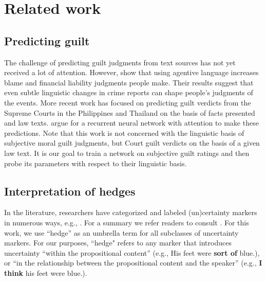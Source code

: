 \documentclass[11pt,a4paper]{article}
\begin{document}
\section{Related work}

\subsection{Predicting guilt}
The challenge of predicting guilt judgments from text sources has not yet received a lot of attention. 
However, \citeauthor{Fausey:Boroditsky:2010} show that using agentive language increases blame and financial liability judgments people make. Their results suggest that even subtle linguistic changes in crime reports can shape people's judgments of the events.
More recent work has focused on predicting guilt verdicts from the Supreme Courts in the Philippines \citep{virtucio2018predicting} and Thailand \citep{kowsrihawat2018predicting} on the basis of facts presented and law texts. \citeauthor{kowsrihawat2018predicting} argue for a recurrent neural network with attention to make these predictions. Note that this work is not concerned with the linguistic basis of subjective moral guilt judgments, but Court guilt verdicts on the basis of a given law text. 
It is our goal to train a network on subjective guilt ratings and then probe its parameters with respect to their linguistic basis.

\subsection{Interpretation of hedges}

In the literature, researchers have categorized and labeled (un)certainty markers in numerous ways, e.g., \citep{lakoff1972hedges, prince1982hedging, brown1987politeness}. For a summary we refer readers to consult \cite{fraser2010pragmatic}. 
For this work, we use ``hedge'' as an umbrella term for all subclasses of uncertainty markers. For our purposes, ``hedge" refers to any marker that introduces uncertainty ``within the propositional content'' (e.g., His feet were \textbf{sort of} blue.), or ``in the relationship between the propositional content and the speaker'' (e.g., \textbf{I think} his feet were blue.). 
\end{document}
